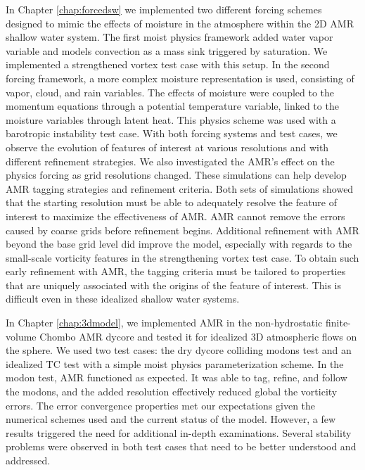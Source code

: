 In Chapter \ref{chap:forcedsw} we implemented two different forcing schemes designed to 
mimic the effects of moisture in the atmosphere within the 2D AMR
shallow water system. The first moist physics
framework added water vapor variable and models convection
as a mass sink triggered by saturation. We implemented a
strengthened vortex test case with this setup.  In the second
forcing framework, a more complex moisture representation
is used, consisting of vapor, cloud, and rain variables.
The effects of moisture were coupled to the momentum equations
through a potential temperature variable, linked to
the moisture variables through latent heat. This physics
scheme was used with a barotropic instability test case. 
With both forcing systems and test cases, we observe the evolution
 of features of interest at various resolutions and 
with different refinement strategies. 
We also investigated the AMR's effect on the physics 
forcing as grid resolutions changed.
These simulations can help develop AMR tagging strategies and refinement criteria.
Both sets of simulations showed that the starting resolution must be
able to adequately resolve the feature of interest to maximize
the effectiveness of AMR. AMR cannot remove the errors
caused by coarse grids before refinement begins. Additional refinement with
AMR beyond the base grid level did improve the model, especially
with regards to the small-scale vorticity features in the strengthening vortex test case.
To obtain such early refinement with AMR, the tagging
criteria must be tailored to properties that are uniquely associated
with the origins of the feature of interest. This is difficult even in these 
idealized shallow water systems.

In Chapter \ref{chap:3dmodel}, we implemented AMR in 
the non-hydrostatic finite-volume Chombo AMR dycore
and tested it for idealized 3D atmospheric flows on the sphere. 
We used two test cases: the dry dycore colliding modons
test and an idealized TC test with a simple moist physics parameterization scheme.
In the modon test, AMR functioned as expected. It was able to tag, refine, and follow the modons,
and the added resolution  effectively reduced global the vorticity errors.
The error convergence properties met our expectations given the numerical 
schemes used and the current status of the model. However, a
 few results triggered the need for additional in-depth examinations.
Several stability problems were observed in both test cases 
that need to be better understood and addressed.

